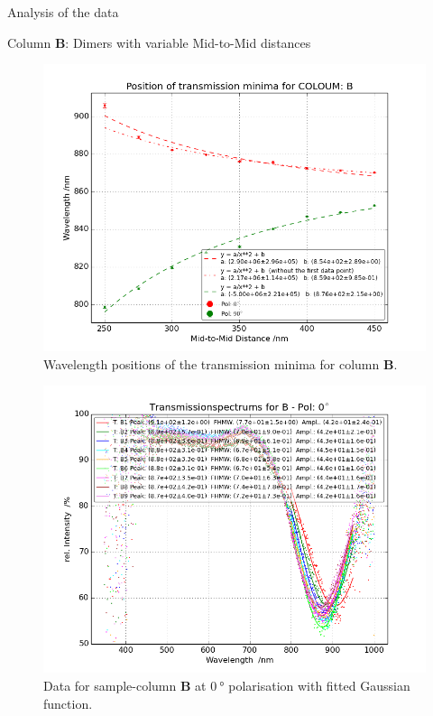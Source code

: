 \documentclass[pdftex, a4paper,11pt, twoside, UKenglish]{report}
\begin{document}
\begin{chapter}{Analysis of the data}
\begin{section}{Column \textbf{B}: Dimers with variable Mid-to-Mid
        distances}
      \begin{figure}[b!]
        \centering
        \includegraphics[width=\textwidth]{Figures/MinimaPosB.png}
        \caption{Wavelength positions of the transmission minima for column
            \textbf{B}.}
        \label{fig:MinimaPosB}
      \end{figure}
      \newpage
      \begin{figure}[ht!]
        \centering
        \begin{minipage}{.95\textwidth}
          \centering
          \includegraphics[width=\textwidth]
              {Figures/TransspecFIT_BPol0.png}
          \caption{Data for sample-column \textbf{B} at $\SI{0}{\degree}$
              polarisation with fitted Gaussian function.}

\end{minipage}
\end{figure}
\end{section}
\end{chapter}
\end{document}
